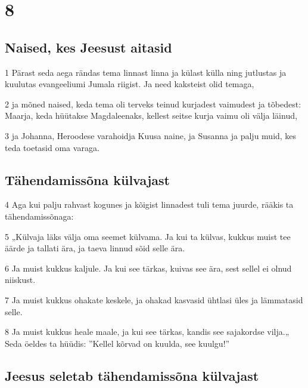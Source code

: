 \chapter{8}

\section*{Naised, kes Jeesust aitasid}

\par 1 Pärast seda aega rändas tema linnast linna ja külast külla ning jutlustas ja kuulutas evangeeliumi Jumala riigist. Ja need kaksteist olid temaga,
\par 2 ja mõned naised, keda tema oli terveks teinud kurjadest vaimudest ja tõbedest: Maarja, keda hüütakse Magdaleenaks, kellest seitse kurja vaimu oli välja läinud,
\par 3 ja Johanna, Heroodese varahoidja Kuusa naine, ja Susanna ja palju muid, kes teda toetasid oma varaga.

\section*{Tähendamissõna külvajast}

\par 4 Aga kui palju rahvast kogunes ja kõigist linnadest tuli tema juurde, rääkis ta tähendamissõnaga:
\par 5 „Külvaja läks välja oma seemet külvama. Ja kui ta külvas, kukkus muist tee äärde ja tallati ära, ja taeva linnud sõid selle ära.
\par 6 Ja muist kukkus kaljule. Ja kui see tärkas, kuivas see ära, sest sellel ei olnud niiskust.
\par 7 Ja muist kukkus ohakate keskele, ja ohakad kasvasid ühtlasi üles ja lämmatasid selle.
\par 8 Ja muist kukkus heale maale, ja kui see tärkas, kandis see sajakordse vilja.„ Seda öeldes ta hüüdis: ”Kellel kõrvad on kuulda, see kuulgu!”

\section*{Jeesus seletab tähendamissõna külvajast}

